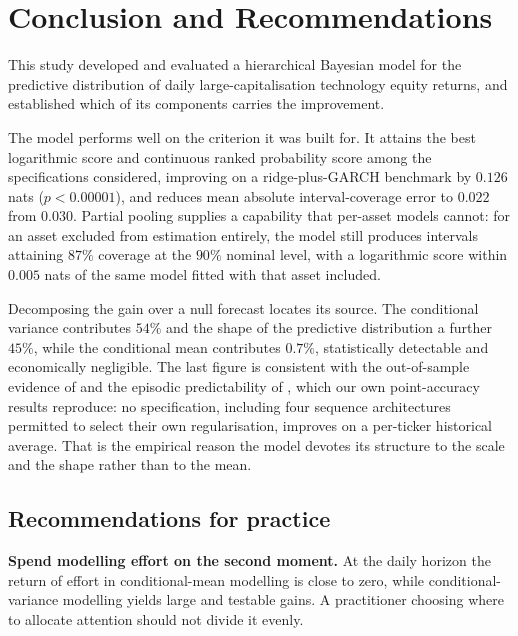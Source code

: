 
\section{Conclusion and Recommendations}
\label{sec:conclusion}

This study developed and evaluated a hierarchical Bayesian model for the
predictive distribution of daily large-capitalisation technology equity returns,
and established which of its components carries the improvement.

The model performs well on the criterion it was built for. It attains the best
logarithmic score and continuous ranked probability score among the
specifications considered, improving on a ridge-plus-GARCH benchmark by $0.126$
nats ($p<0.00001$), and reduces mean absolute interval-coverage error to $0.022$
from $0.030$. Partial pooling supplies a capability that per-asset models cannot:
for an asset excluded from estimation entirely, the model still produces
intervals attaining $87\%$ coverage at the $90\%$ nominal level, with a
logarithmic score within $0.005$ nats of the same model fitted with that asset
included.

Decomposing the gain over a null forecast locates its source. The conditional
variance contributes $54\%$ and the shape of the predictive distribution a
further $45\%$, while the conditional mean contributes $0.7\%$, statistically
detectable and economically negligible. The last figure is consistent with the
out-of-sample evidence of \citet{welch2008comprehensive} and the episodic
predictability of \citet{timmermann2008elusive}, which our own point-accuracy
results reproduce: no specification, including four sequence architectures
permitted to select their own regularisation, improves on a per-ticker
historical average. That is the empirical reason the model devotes its structure
to the scale and the shape rather than to the mean.

\subsection{Recommendations for practice}

\textbf{Spend modelling effort on the second moment.} At the daily horizon the
return of effort in conditional-mean modelling is close to zero, while
conditional-variance modelling yields large and testable gains. A practitioner
choosing where to allocate attention should not divide it evenly.

